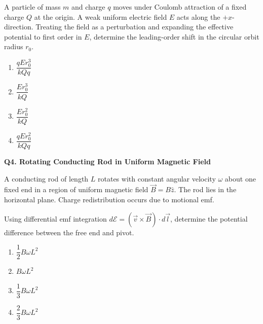 \documentclass[12pt]{article}
\begin{document}
A particle of mass $m$ and charge $q$ moves under Coulomb attraction of a fixed charge $Q$ at the origin. A weak uniform electric field $E$ acts along the $+x$-direction. Treating the field as a perturbation and expanding the effective potential to first order in $E$, determine the leading-order shift in the circular orbit radius $r_0$.

\begin{enumerate}
\item[(A)] $\dfrac{qE r_0^3}{kQq}$
\item[(B)] $\dfrac{E r_0^3}{kQ}$
\item[(C)] $\dfrac{E r_0^2}{kQ}$
\item[(D)] $\dfrac{qE r_0^2}{kQq}$
\end{enumerate}

\textbf{Q4. Rotating Conducting Rod in Uniform Magnetic Field}



A conducting rod of length $L$ rotates with constant angular velocity $\omega$ about one fixed end in a region of uniform magnetic field $\vec B = B\hat z$. The rod lies in the horizontal plane. Charge redistribution occurs due to motional emf.

Using differential emf integration $d\mathcal{E} = ( \vec v \times \vec B )\cdot d\vec l$, determine the potential difference between the free end and pivot.

\begin{center}
\end{center}

\begin{enumerate}
\item[(A)] $\dfrac{1}{2} B\omega L^2$
\item[(B)] $B\omega L^2$
\item[(C)] $\dfrac{1}{3} B\omega L^2$
\item[(D)] $\dfrac{2}{3} B\omega L^2$
\end{enumerate}
\end{document}

